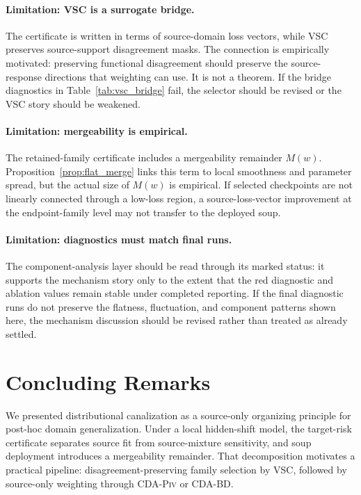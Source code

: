 \documentclass{article}
\newif\ifsubmissionmode
\newcommand{\placeholderguard}[1]{%
  \ifsubmissionmode
    \PackageError{cda_final_v2}{Provisional red content remains in submission mode}{Remove all provisional red content before building in submission mode.}%
  \else
    {\color{red!70!black}#1}%
  \fi
}
\newcommand{\prov}[1]{\placeholderguard{#1}}
\theoremstyle{definition}
\newcommand{\vsc}{\textup{\textsc{VSC}}}
\newcommand{\piv}{\textup{\textsc{CDA-Piv}}}
\newcommand{\bd}{\textup{\textsc{CDA-BD}}}
\begin{document}
\paragraph{Limitation: VSC is a surrogate bridge.}
The certificate is written in terms of source-domain loss vectors, while VSC preserves source-support disagreement masks. The connection is empirically motivated: preserving functional disagreement should preserve the source-response directions that weighting can use. It is not a theorem. If the bridge diagnostics in Table~\ref{tab:vsc_bridge} fail, the selector should be revised or the VSC story should be weakened.

\paragraph{Limitation: mergeability is empirical.}
The retained-family certificate includes a mergeability remainder \(M(w)\). Proposition~\ref{prop:flat_merge} links this term to local smoothness and parameter spread, but the actual size of \(M(w)\) is empirical. If selected checkpoints are not linearly connected through a low-loss region, a source-loss-vector improvement at the endpoint-family level may not transfer to the deployed soup.

\paragraph{Limitation: diagnostics must match final runs.}
\prov{The component-analysis layer should be read through its marked status: it supports the mechanism story only to the extent that the red diagnostic and ablation values remain stable under completed reporting. If the final diagnostic runs do not preserve the flatness, fluctuation, and component patterns shown here, the mechanism discussion should be revised rather than treated as already settled.}

\section{Concluding Remarks}

We presented distributional canalization as a source-only organizing principle for post-hoc domain generalization. Under a local hidden-shift model, the target-risk certificate separates source fit from source-mixture sensitivity, and soup deployment introduces a mergeability remainder. That decomposition motivates a practical pipeline: disagreement-preserving family selection by \vsc{}, followed by source-only weighting through \piv{} or \bd{}.
\end{document}
